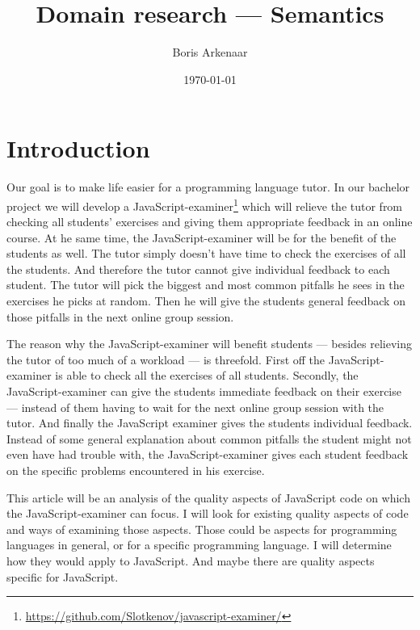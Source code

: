 \documentclass{article}
\begin{document}
 

\title{Domain research --- Semantics}
\author{Boris Arkenaar}
\date{\today}
\maketitle 


\section{Introduction} 

Our goal is to make life easier for a programming language tutor. In our
bachelor project we will develop a
JavaScript-examiner\footnote{\url{https://github.com/Slotkenov/javascript-examiner/}}
which will relieve the tutor from checking all students' exercises and
giving them appropriate feedback in an online course. At he same time, the
JavaScript-examiner will be for the benefit of the students as well. The
tutor simply doesn't have time to check the exercises of all the
students. And therefore the tutor cannot give individual feedback to each
student. The tutor will pick the biggest and most common pitfalls he sees in
the exercises he picks at random. Then he will give the students general
feedback on those pitfalls in the next online group session.

The reason why the JavaScript-examiner will benefit students --- besides
relieving the tutor of too much of a workload --- is threefold.  First off
the JavaScript-examiner is able to check all the exercises of all
students. Secondly, the JavaScript-examiner can give the students immediate
feedback on their exercise --- instead of them having to wait for the next
online group session with the tutor. And finally the JavaScript examiner
gives the students individual feedback. Instead of some general explanation
about common pitfalls the student might not even have had trouble with, the
JavaScript-examiner gives each student feedback on the specific problems
encountered in his exercise.

This article will be an analysis of the quality aspects of JavaScript code on
which the JavaScript-examiner can focus. I will look for existing quality
aspects of code and ways of examining those aspects. Those could be aspects for
programming languages in general, or for a specific programming language. I
will determine how they would apply to JavaScript. And maybe there are quality
aspects specific for JavaScript.
\end{document}
